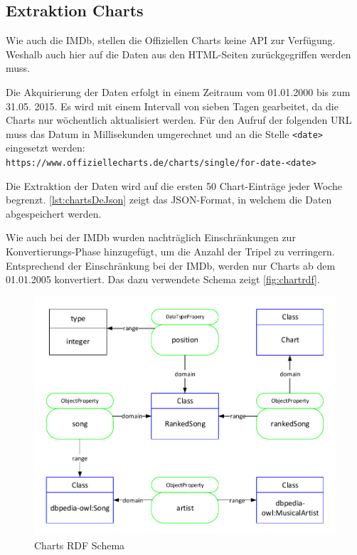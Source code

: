 \documentclass[parskip]{scrartcl}
\begin{document}
\subsection{Extraktion Charts}

Wie auch die IMDb, stellen die Offiziellen Charts keine API zur Verfügung. Weshalb auch hier auf die Daten aus den HTML-Seiten zurückgegriffen werden muss.

Die Akquirierung der Daten erfolgt in einem Zeitraum vom 01.01.2000 bis zum 31.05. 2015. Es wird mit einem Intervall von sieben Tagen gearbeitet, da die Charts nur wöchentlich aktualisiert werden. Für den Aufruf der folgenden URL muss das Datum in Millisekunden umgerechnet und an die Stelle \texttt{<date>} eingesetzt werden:\\
\texttt{https://www.offiziellecharts.de/charts/single/for-date-<date>}

Die Extraktion der Daten wird auf die ersten 50 Chart-Einträge jeder Woche begrenzt. \autoref{lst:chartsDeJson} zeigt das JSON-Format, in welchem die Daten abgespeichert werden.

Wie auch bei der IMDb wurden nachträglich Einschränkungen zur Konvertierungs-Phase hinzugefügt, um die Anzahl der Tripel zu verringern. Entsprechend der Einschränkung bei der IMDb, werden nur Charts ab dem 01.01.2005 konvertiert. Das dazu verwendete Schema zeigt \autoref{fig:chartrdf}.

\begin{figure}[H]
    \centering
    \includegraphics[scale=0.8]{charts}
    \caption{Charts RDF Schema}
    \label{fig:chartrdf}
\end{figure}
\end{document}

